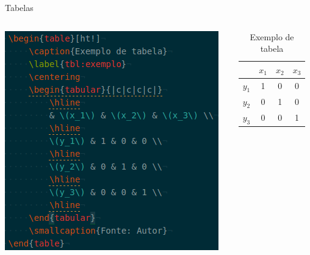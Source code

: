 \documentclass{beamer}
\begin{document}
\begin{frame}{Tabelas}
    \begin{columns}[T]
        \begin{column}{.5\textwidth}
            \begin{block}{}
                \includegraphics[width=\columnwidth]{tabela}
            \end{block}
        \end{column}
        \begin{column}{.5\textwidth}
            \begin{block}{}
                \begin{table}[ht!]
                    \caption{Exemplo de tabela}
                    \label{tbl:exemplo}
                    \centering
                    \begin{tabular}{|c|c|c|c|}
                        \hline
                        & \(x_1\) & \(x_2\) & \(x_3\) \\
                        \hline
                        \(y_1\) & 1 & 0 & 0 \\
                        \hline
                        \(y_2\) & 0 & 1 & 0 \\
                        \hline
                        \(y_3\) & 0 & 0 & 1 \\
                        \hline
                    \end{tabular}\\
                \end{table}
            \end{block}
        \end{column}
    \end{columns}
\end{frame}
\end{document}
